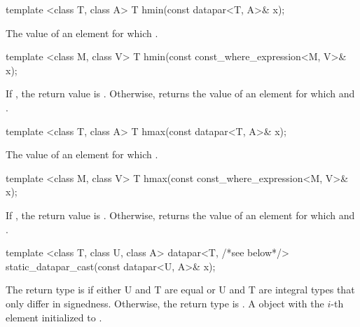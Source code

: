 \begin{itemdecl}
template <class T, class A> T hmin(const datapar<T, A>& x);
\end{itemdecl}
\begin{itemdescr}
  \pnum\returns The value of an element  for which  \foralli.
\end{itemdescr}

\begin{itemdecl}
template <class M, class V> T hmin(const const_where_expression<M, V>& x);
\end{itemdecl}
\begin{itemdescr}
  \pnum\returns If , the return value is .
  Otherwise, returns the value of an element  for which  and  \foralli.
\end{itemdescr}

\begin{itemdecl}
template <class T, class A> T hmax(const datapar<T, A>& x);
\end{itemdecl}
\begin{itemdescr}
  \pnum\returns The value of an element  for which  \foralli.
\end{itemdescr}

\begin{itemdecl}
template <class M, class V> T hmax(const const_where_expression<M, V>& x);
\end{itemdecl}
\begin{itemdescr}
  \pnum\returns If , the return value is .
  Otherwise, returns the value of an element  for which  and  \foralli.
\end{itemdescr}


\begin{itemdecl}
template <class T, class U, class A>
datapar<T, /*see below*/> static_datapar_cast(const datapar<U, A>& x);
\end{itemdecl}
\begin{itemdescr}
  \pnum\remarks The return type is \datapar[<T, A>] if either \type U and \type T are equal or \type U and \type T are integral types that only differ in signedness.
  Otherwise, the return type is .
  \pnum\returns A \datapar object with the $i$-th element initialized to .
\end{itemdescr}


